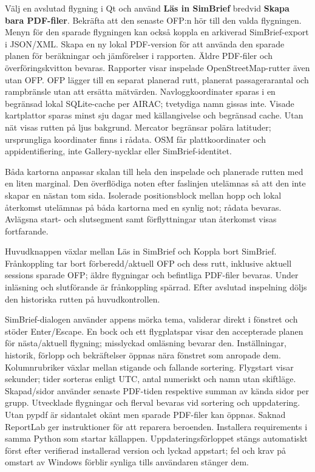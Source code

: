 \documentclass[11pt,a4paper]{article}
\newcommand{\ui}[1]{\textbf{#1}}
\begin{document}
Välj en avslutad flygning i Qt och använd \ui{Läs in SimBrief} bredvid
\ui{Skapa bara PDF-filer}. Bekräfta att den senaste OFP:n hör till den valda
flygningen. Menyn för den sparade flygningen kan också koppla en arkiverad
SimBrief-export i JSON/XML. Skapa en ny lokal PDF-version för att använda
den sparade planen för beräkningar och jämförelser i rapporten. Äldre PDF-filer
och överföringskvitton bevaras.
Rapporter visar inspelade OpenStreetMap-rutter även utan OFP. OFP lägger till
en separat planerad rutt, planerat passagerarantal och rampbränsle utan att
ersätta mätvärden. Navloggkoordinater sparas i en begränsad lokal SQLite-cache
per AIRAC; tvetydiga namn gissas inte. Visade kartplattor sparas minst sju dagar
med källangivelse och begränsad cache. Utan nät visas rutten på ljus bakgrund.
Mercator begränsar polära latituder; ursprungliga koordinater finns i rådata.
OSM får plattkoordinater och appidentifiering, inte Gallery-nycklar eller
SimBrief-identitet.

Båda kartorna anpassar skalan till hela den inspelade och planerade rutten
med en liten marginal. Den överflödiga noten efter faslinjen utelämnas så
att den inte skapar en nästan tom sida.
Isolerade positionsblock mellan hopp och lokal återkomst utelämnas
på båda kartorna med en synlig not; rådata bevaras. Avlägsna start- och
slutsegment samt förflyttningar utan återkomst visas fortfarande.

Huvudknappen växlar mellan Läs in SimBrief och Koppla bort SimBrief.
Frånkoppling tar bort förberedd/aktuell OFP och dess rutt, inklusive aktuell
sessions sparade OFP; äldre flygningar och befintliga PDF-filer bevaras.
Under inläsning och slutförande är frånkoppling spärrad. Efter avslutad
inspelning döljs den historiska rutten på huvudkontrollen.

SimBrief-dialogen använder appens mörka tema, validerar direkt i fönstret
och stöder Enter/Escape. En bock och ett flygplatspar visar den accepterade
planen
för nästa/aktuell flygning; misslyckad omläsning bevarar den. Inställningar,
historik, förlopp och bekräftelser öppnas nära fönstret som anropade dem.
Kolumnrubriker växlar mellan stigande och fallande sortering. Flygstart visar
sekunder; tider sorteras enligt UTC, antal numeriskt och namn utan skiftläge.
Skapad/sidor använder senaste PDF-tiden respektive summan av kända sidor per
grupp. Utvecklade flygningar och flerval bevaras vid sortering och uppdatering.
Utan pypdf är sidantalet okänt men sparade PDF-filer kan öppnas. Saknad
ReportLab
ger instruktioner för att reparera beroenden. Installera requirements i samma
Python som startar källappen. Uppdateringsförloppet stängs automatiskt först
efter
verifierad installerad version och lyckad appstart; fel och krav på omstart av
Windows förblir synliga tills användaren stänger dem.
\end{document}
